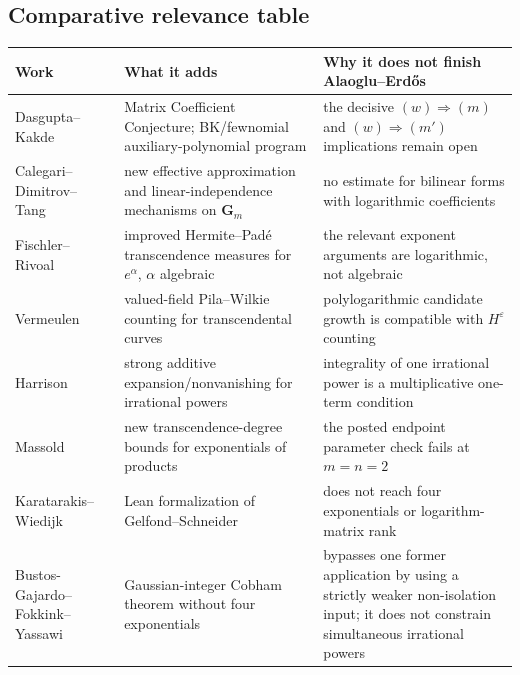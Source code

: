\documentclass[11pt,oneside]{article}
\theoremstyle{definition}
\theoremstyle{remark}
\begin{document}
\subsection{Comparative relevance table}

\begin{center}
\small
\begin{tabularx}{0.98\textwidth}{>{\raggedright\arraybackslash}p{}
                                  >{\raggedright\arraybackslash}X
                                  >{\raggedright\arraybackslash}X}
\toprule
Work & What it adds & Why it does not finish Alaoglu--Erd\H{o}s \\
\midrule
Dasgupta--Kakde~\cite{DasguptaKakde2026} & Matrix Coefficient Conjecture; BK/fewnomial
auxiliary-polynomial program & the decisive $(w)\Rightarrow(m)$ and
$(w)\Rightarrow(m')$ implications remain open \\
Calegari--Dimitrov--Tang~\cite{CalegariDimitrovTang2025} & new effective approximation and
linear-independence mechanisms on $\mathbf G_m$ & no estimate for bilinear forms with
logarithmic coefficients \\
Fischler--Rivoal~\cite{FischlerRivoal2025} & improved Hermite--Pad\'e transcendence measures
for $e^\alpha$, $\alpha$ algebraic & the relevant exponent arguments are logarithmic, not
algebraic \\
Vermeulen~\cite{Vermeulen2025} & valued-field Pila--Wilkie counting for transcendental curves
& polylogarithmic candidate growth is compatible with $H^\varepsilon$ counting \\
Harrison~\cite{Harrison2026} & strong additive expansion/nonvanishing for irrational powers &
integrality of one irrational power is a multiplicative one-term condition \\
Massold~\cite{Massold2025} & new transcendence-degree bounds for exponentials of products &
the posted endpoint parameter check fails at $m=n=2$ \\
Karatarakis--Wiedijk~\cite{KaratarakisWiedijk2026} & Lean formalization of
Gelfond--Schneider & does not reach four exponentials or logarithm-matrix rank \\
Bustos-Gajardo--Fokkink--Yassawi~\cite{BustosGajardoFokkinkYassawi2026} &
Gaussian-integer Cobham theorem without four exponentials & bypasses one former application by
using a strictly weaker non-isolation input; it does not constrain simultaneous irrational powers \\
\bottomrule
\end{tabularx}
\end{center}
\end{document}

